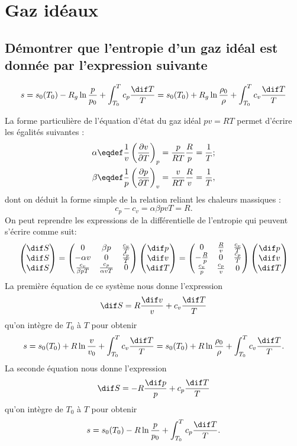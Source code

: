 \section{Gaz idéaux}
\subsection{Démontrer que l'entropie d'un gaz idéal est donnée par l'expression suivante}
\[ s = s_0(T_0) - R_g \ln\frac{p}{p_0} + \int_{T_0}^T c_p \frac{\dif T}{T}
	=  s_0(T_0) + R_g \ln\frac{\rho_0}{\rho} + \int_{T_0}^T c_v \frac{\dif T}{T}
\]

La forme particulière de l'équation d'état du gaz idéal $pv = RT$ permet d'écrire les égalités suivantes :
\begin{align*}
	\alpha &\eqdef \frac{1}{v}\thermodiff{v}{T}{p} = \frac{p}{RT}\frac{R}{p} = \frac{1}{T}; \\
	\beta  &\eqdef \frac{1}{p}\thermodiff{p}{T}{v} = \frac{v}{RT}\frac{R}{v} = \frac{1}{T},
\end{align*}
dont on déduit la forme simple de la relation reliant les chaleurs massiques :
\[ c_p - c_v = \alpha\beta p v T = R. \]
On peut reprendre les expressions de la différentielle de l'entropie qui peuvent s'écrire
comme suit:
\[
	\begin{pmatrix} \dif S \\ \dif S \\ \dif S \end{pmatrix} 
	= 
	\begin{pmatrix}
		0 & \beta p & \frac{c_v}{T} \\
		-\alpha v & 0 & \frac{c_p}{T} \\
		\frac{c_v}{\beta p T} & \frac{c_p}{\alpha v T} & 0
	\end{pmatrix}
	\begin{pmatrix} \dif p \\ \dif v \\ \dif T \end{pmatrix}
	=
	\begin{pmatrix}
		0 & \frac{R}{v} & \frac{c_v}{T} \\
		-\frac{R}{p} & 0 & \frac{c_p}{T} \\
		\frac{c_v}{p} & \frac{c_p}{v} & 0
	\end{pmatrix}
	\begin{pmatrix} \dif p \\ \dif v \\ \dif T \end{pmatrix}
\]
La première équation de ce système nous donne l'expression
\[ \dif S = R\frac{\dif v}{v} + c_v\frac{\dif T}{T} \]
qu'on intègre de $T_0$ à $T$ pour obtenir
\[ s = s_0(T_0) + R\ln\frac{v}{v_0} + \int_{T_0}^T c_v\frac{\dif T}{T}
	 = s_0(T_0) + R\ln\frac{\rho_0}{\rho} + \int_{T_0}^T c_v\frac{\dif T}{T}. \]
La seconde équation nous donne l'expression
\[ \dif S = -R\frac{\dif p}{p} + c_p \frac{\dif T}{T} \]
qu'on intègre de $T_0$ à $T$ pour obtenir
\[ s = s_0(T_0) - R\ln\frac{p}{p_0} + \int_{T_0}^T c_p\frac{\dif T}{T}. \]

